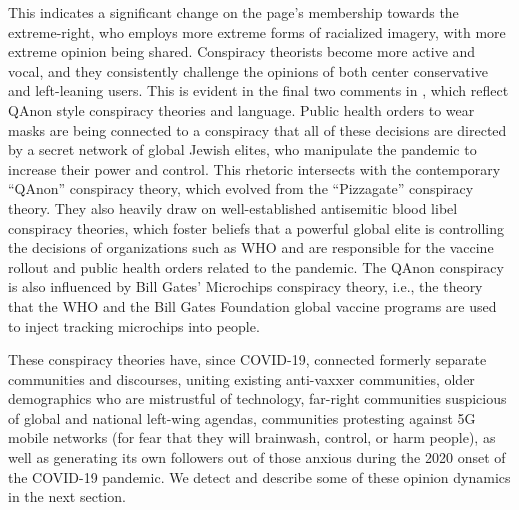 This indicates a significant change on the page's membership towards the extreme-right, who employs more extreme forms of racialized imagery, with more extreme opinion being shared.
Conspiracy theorists become more active and vocal, and they consistently challenge the opinions of both center conservative and left-leaning users. 
This is evident in the final two comments in , which reflect QAnon style conspiracy theories and language.
Public health orders to wear masks are being connected to a conspiracy that all of these decisions are directed by a secret network of global Jewish elites, who manipulate the pandemic to increase their power and control. 
This rhetoric intersects with the contemporary ``QAnon'' conspiracy theory, which evolved from the ``Pizzagate'' conspiracy theory.
They also heavily draw on well-established antisemitic blood libel conspiracy theories, which foster beliefs that a powerful global elite is controlling the decisions of organizations such as WHO and are responsible for the vaccine rollout and public health orders related to the pandemic.
The QAnon conspiracy is also influenced by Bill Gates' Microchips conspiracy theory, i.e., the theory that the WHO and the Bill Gates Foundation global vaccine programs are used to inject tracking microchips into people.

These conspiracy theories have, since COVID-19, connected formerly separate communities and discourses, uniting existing anti-vaxxer communities, older demographics who are mistrustful of technology, far-right communities suspicious of global and national left-wing agendas, communities protesting against 5G mobile networks (for fear that they will brainwash, control, or harm people), as well as generating its own followers out of those anxious during the 2020 onset of the COVID-19 pandemic.
We detect and describe some of these opinion dynamics in the next section.
